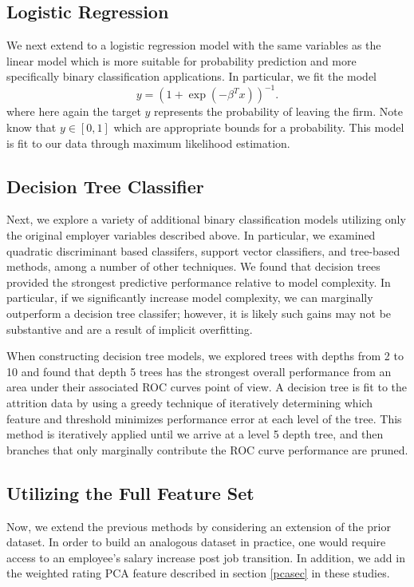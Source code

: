 \documentclass[10pt]{article}
\begin{document}
\subsection{Logistic Regression} We next extend to a logistic regression model with the 
same variables as the linear model which 
is more suitable for probability prediction and more specifically binary classification 
applications.   In particular, we fit the model 
%
\begin{equation}
    y = (1+\exp(-\beta^Tx))^{-1}.
\end{equation}
% 
where here again the target $y$ represents the probability of leaving the firm. 
Note know that $y\in[0,1]$ which are appropriate bounds for a probability.  This 
model is fit to our data through maximum likelihood estimation. 

\subsection{Decision Tree Classifier}  Next, we explore a variety of additional 
binary classification models utilizing only the original employer variables described above.
In particular, we examined quadratic discriminant based classifers, support vector classifiers, 
and tree-based methods, among a number of other techniques.  We found that decision 
trees provided the strongest predictive performance relative to model complexity. 
In particular, if we significantly increase model complexity, we can marginally outperform 
a decision tree classifer; however, it is likely such gains may not be substantive and 
are a result of implicit overfitting. 


When constructing decision tree models, we explored trees with depths from 2 to 10 and 
found that depth 5 trees has the strongest overall performance from an area under their 
associated ROC curves point of view. 
A decision tree is fit to the attrition data by using a greedy technique of 
iteratively determining which feature and threshold minimizes performance error 
at each level of the tree.  This method is iteratively applied until we arrive 
at a level 5 depth tree, and then branches that only marginally contribute 
the ROC curve performance are pruned.  

\subsection{Utilizing the Full Feature Set} 
Now, we extend the previous methods by considering an extension of the 
prior dataset.  In order to build an analogous dataset in practice, one would require access to 
an employee's salary increase post job transition.
In addition, we add in the weighted rating PCA feature 
described in section \ref{pcasec} in these studies.
\end{document}
